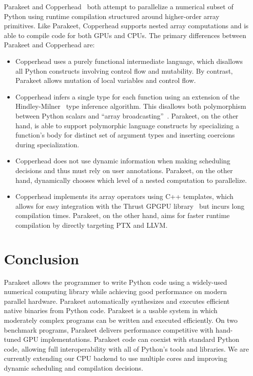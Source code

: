 \documentclass[10pt,twocolumn]{article}
\begin{document}
Parakeet and Copperhead~\cite{Cata11} both attempt to parallelize a numerical subset of Python using runtime compilation structured around higher-order array primitives. Like Parakeet, Copperhead supports nested array computations and is able to compile code for both GPUs and CPUs. The primary differences between Parakeet and Copperhead are:
\begin{itemize}
 \item Copperhead uses a purely functional intermediate language, which disallows all Python constructs involving control flow and mutability. By contrast, Parakeet allows mutation of local variables and control flow. 
 \item Copperhead infers a single type for each function using an extension of the Hindley-Milner~\cite{Damas82} type inference algorithm. This disallows both polymorphism between Python scalars and ``array broadcasting''~\cite{Oliphant07}. Parakeet, on the other hand, is able to support polymorphic language constructs by specializing a function's body for distinct set of argument types and inserting coercions during specialization.
 \item Copperhead does not use dynamic information when making scheduling decisions and thus must rely on user annotations. Parakeet, on the other hand, dynamically chooses which level of a nested computation to parallelize. 
 \item Copperhead implements its array operators using C++ templates, which allows for easy integration with the Thrust GPGPU library~\cite{Hobe10} but incurs long compilation times. Parakeet, on the other hand, aims for faster runtime compilation by directly targeting PTX and LLVM. 
\end{itemize}

\section{Conclusion}
\label{Conclusion}
Parakeet allows the programmer to write Python code using a widely-used numerical computing library while achieving good performance on modern parallel hardware. 
Parakeet automatically synthesizes and executes efficient native binaries from Python code. Parakeet is a usable system in which moderately complex programs can be written and executed efficiently.  
On two benchmark programs, Parakeet delivers performance competitive with hand-tuned GPU implementations.  Parakeet code can coexist with standard Python code, allowing full interoperability with all of Python's tools and libraries.
We are currently extending our CPU backend to use multiple cores and improving dynamic scheduling and compilation decisions. 
{\small

{}
}
\end{document}
